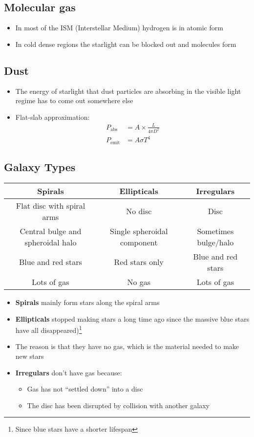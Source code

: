 \documentclass{article}
\begin{document}
\subsection{Molecular gas}
\begin{itemize}
\item In most of the ISM (Interstellar Medium) hydrogen is in atomic form
\item In cold dense regions the starlight can be blocked out and molecules form
\end{itemize}
\subsection{Dust}
\begin{itemize}
\item The energy of starlight that dust particles are absorbing
in the visible light regime has to come out somewhere else
\item Flat-slab approximation:
\begin{align}
P_\text{abs}&=A \times \frac{L}{4 \pi D^2}\\
P_\text{emit}&= A \sigma T^4
\end{align}
\end{itemize}
\subsection{Galaxy Types}
\begin{table}[h!]
  \begin{center}
    \begin{tabular}{c|c|c}
      \textbf{Spirals} & \textbf{Ellipticals} &\textbf{Irregulars}\\
      \hline\hline
      Flat disc with spiral arms & No disc & Disc\\
      Central bulge and spheroidal halo & Single spheroidal component & Sometimes bulge/halo\\
      Blue and red stars & Red stars only & Blue and red stars\\
      Lots of gas & No gas & Lots of gas\\   
    \end{tabular}
  \end{center}
\end{table}
\begin{itemize}
\item \textbf{Spirals} mainly form stars along the spiral arms 
\item \textbf{Ellipticals} stopped making stars a long time ago since the massive blue stars have all disappeared)\footnote{Since blue stars have a shorter lifespan}
\item The reason is that they have no gas, which is the material needed to make new stars
\item \textbf{Irregulars} don't have gas because:
\begin{itemize}
\item Gas has not “settled down” into a disc
\item The disc has been disrupted by collision with another galaxy
\end{itemize}
\end{itemize}
\end{document}
